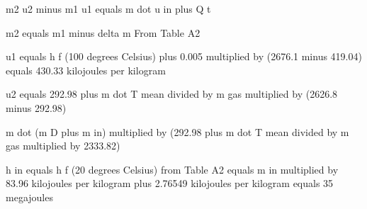 m2 u2 minus m1 u1 equals m dot u in plus Q t  

m2 equals m1 minus delta m  
From Table A2  

u1 equals h f (100 degrees Celsius) plus 0.005 multiplied by (2676.1 minus 419.04)  
equals 430.33 kilojoules per kilogram  

u2 equals 292.98 plus m dot T mean divided by m gas multiplied by (2626.8 minus 292.98)  

m dot (m D plus m in) multiplied by (292.98 plus m dot T mean divided by m gas multiplied by 2333.82)  

h in equals h f (20 degrees Celsius) from Table A2  
equals m in multiplied by 83.96 kilojoules per kilogram plus 2.76549 kilojoules per kilogram equals 35 megajoules